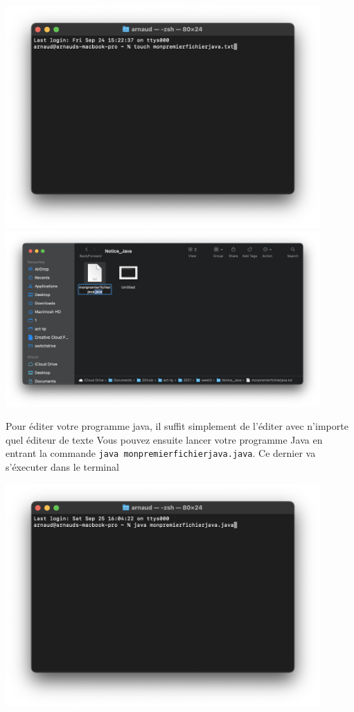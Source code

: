 \begin{center}
	\includegraphics[width=12cm]{terminal.png}
	\includegraphics[width=12cm]{ext}
	
\end{center}

Pour éditer votre programme java, il suffit simplement de l'éditer avec n'importe quel éditeur de texte
Vous pouvez ensuite lancer votre programme Java en entrant la commande \lstinline{java monpremierfichierjava.java}. Ce dernier va s'éxecuter dans le terminal
\begin{center}
	\includegraphics[width=12cm]{exe}	
\end{center}
 

